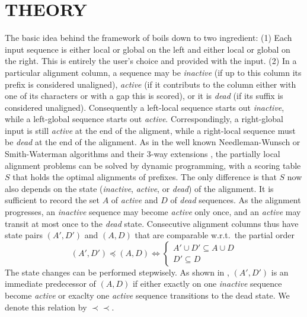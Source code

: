 \documentclass[a4paper,10pt]{article}
\newcommand{\pprec}{\mathrel{\prec\!\!\!\prec}}
\begin{document}
\section{\uppercase{Theory}}

The basic idea behind the framework of \cite{Retzlaff:18a} boils down to
two ingredient: (1) Each input sequence is either local or global on the
left and either local or global on the right. This is entirely the user's
choice and provided with the input. (2) In a particular alignment column, a
sequence may be \textit{inactive} (if up to this column its prefix is
considered unaligned), \textit{active} (if it contributs to the column
either with one of its characters or with a gap this is scored), or it is
\textit{dead} (if its suffix is considered unaligned). Consequently a
left-local sequence starts out \textit{inactive}, while a left-global
sequence starts out \textit{active}. Correspondingly, a right-global input
is still \textit{active} at the end of the aligment, while a right-local
sequence must be \textit{dead} at the end of the alignment. As in the well
known Needleman-Wunsch \cite{Needleman:70} or Smith-Waterman
\cite{Smith:81} algorithms and their 3-way extensions \cite{Gotoh:86}, the
partially local alignment problems can be solved by dynamic programming,
with a scoring table $S$ that holds the optimal alignments of prefixes. The
only difference is that $S$ now also depends on the state
(\textit{inactive}, \textit{active}, or \textit{dead}) of the alignment. It
is sufficient to record the set $A$ of \textit{active} and $D$ of
\textit{dead} sequences. As the alignment progresses, an \textit{inactive}
sequence may become \textit{active} only once, and an \textit{active} may
transit at most once to the \textit{dead} state. Consecutive alignment
columns thus have state pairs $(A',D')$ and $(A,D)$ that are comparable
w.r.t.\ the partial order
\begin{equation}
  (A',D')\preceq(A,D) \iff
    \begin{cases} A'\cup D'\subseteq A\cup D \\
      D'\subseteq D
    \end{cases}
\end{equation}
The state changes can be performed stepwisely. As shown in
\cite{Retzlaff:18a}, $(A',D')$ is an immediate predecessor of $(A,D)$
if either exactly on one \textit{inactive} sequence become \textit{active}
or exaclty one  \textit{active} sequence transitions to the dead state.
We denote this relation by $\pprec$.
\end{document}
